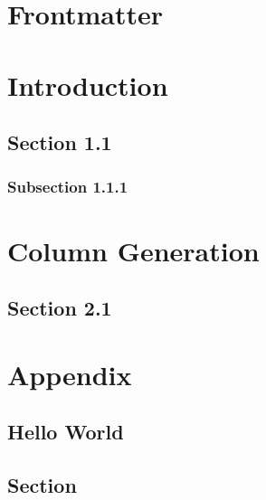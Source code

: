 \documentclass[10pt, a4paper, fontset=none, no-math]{ctexbook}
\begin{document}
\frontmatter

% 

\chapter{Frontmatter}
\lipsum[5-10]

\mainmatter

% 
% 
% 
% 
% 
% 

\chapter{Introduction}

\section{Section 1.1}

\lipsum[5-10]

\subsection{Subsection 1.1.1}

\lipsum[5-10]

\chapter{Column Generation}

\lipsum[5-10]

\section{Section 2.1}

\lipsum[5-10]

\backmatter

% 

\chapter*{Appendix}

\lipsum[5-10]

\section*{Hello World}

\lipsum[10-20]

\section{Section}

\lipsum[5-10]
\end{document}
